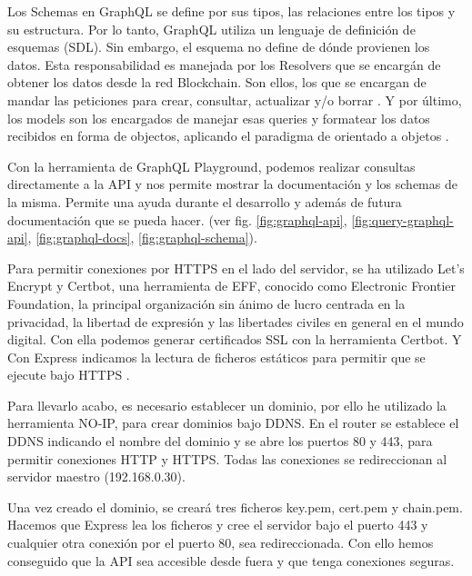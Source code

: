 \noindent Los Schemas en GraphQL se define por sus tipos, las relaciones entre los tipos y su estructura. Por lo 
tanto, GraphQL utiliza un lenguaje de definición de esquemas (SDL). Sin embargo, el esquema no define de dónde 
provienen los datos. Esta responsabilidad es manejada por los Resolvers que se encargán de obtener los datos desde la 
red Blockchain. Son ellos, los que se encargan de mandar las peticiones para crear, consultar, actualizar y/o borrar 
\cite{hyperledger-fabric-couchdb}. Y por último, los models son los encargados de manejar esas queries y formatear los 
datos recibidos en forma de objectos, aplicando el paradigma de orientado a objetos \cite{graphql-server-tutorial, 
thinking-graphs}.

\vspace{5mm}

\noindent Con la herramienta de GraphQL Playground, podemos realizar consultas directamente a la API y nos permite 
mostrar la documentación y los schemas de la misma. Permite una ayuda durante el desarrollo y además de futura 
documentación que se pueda hacer. (ver fig. \ref{fig:graphql-api}, \ref{fig:query-graphql-api}, \ref{fig:graphql-docs}, 
\ref{fig:graphql-schema}).

\vspace{5mm}

\noindent Para permitir conexiones por HTTPS en el lado del servidor, se ha utilizado Let's Encrypt y Certbot, una 
herramienta de EFF, conocido como Electronic Frontier Foundation, la principal organización sin ánimo de lucro centrada 
en la privacidad, la libertad de expresión y las libertades civiles en general en el mundo digital. Con ella podemos 
generar certificados SSL con la herramienta Certbot. Y Con Express indicamos la lectura de ficheros estáticos para 
permitir que se ejecute bajo HTTPS \cite{setup-lets-encrypt}. 

\vspace{5mm}

\noindent Para llevarlo acabo, es necesario establecer un dominio, por ello he utilizado la herramienta NO-IP, para crear 
dominios bajo DDNS. En el router se establece el DDNS indicando el nombre del dominio y se abre los puertos 80 y 443, para 
permitir conexiones HTTP y HTTPS. Todas las conexiones se redireccionan al servidor maestro (192.168.0.30).

\vspace{5mm}

\noindent Una vez creado el dominio, se creará tres ficheros key.pem, cert.pem y chain.pem. Hacemos que Express lea los 
ficheros y cree el servidor bajo el puerto 443 y cualquier otra conexión por el puerto 80, sea redireccionada. Con ello 
hemos conseguido que la API sea accesible desde fuera y que tenga conexiones seguras.

